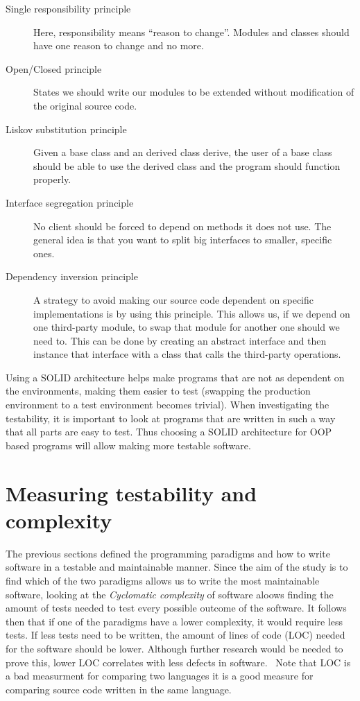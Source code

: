 \begin{description}
    \item [Single responsibility principle] Here, responsibility means ``reason
        to change''. Modules and classes should have one reason to change and no
        more.
    \item [Open/Closed principle] States we should write our modules to be
        extended without modification of the original source code.
    \item [Liskov substitution principle] Given a base class and an derived
        class derive, the user of a base class should be able to use the derived
        class and the program should function properly.
    \item [Interface segregation principle] No client should be forced to depend
        on methods it does not use. The general idea is that you want to split
        big interfaces to smaller, specific ones.
    \item [Dependency inversion principle] A strategy to avoid making our source
        code dependent on specific implementations is by using this principle.
        This allows us, if we depend on one third-party module, to swap that
        module for another one should we need to. This can be done by creating
        an abstract interface and then instance that interface with a class that
        calls the third-party operations.~\cite{martinrobert}
\end{description}

Using a SOLID architecture helps make programs that are not as dependent on the
environments, making them easier to test (swapping the production environment to
a test environment becomes trivial). When investigating the testability, it is
important to look at programs that are written in such a way that all parts
are easy to test. Thus choosing a SOLID architecture for OOP based programs will
allow making more testable software.

\section{Measuring testability and complexity}\label{measuretestability}

The previous sections defined the programming paradigms and how to write
software in a testable and maintainable manner. Since the aim of the study is to
find which of the two paradigms allows us to write the most maintainable
software, looking at the \textit{Cyclomatic complexity} of software aloows
finding the amount of tests needed to test every possible outcome of the
software. It follows then that if one of the paradigms have a lower complexity,
it would require less tests. If less tests need to be written, the amount of
lines of code (LOC) needed for the software should be lower. Although further
research would be needed to prove this, lower LOC correlates with less defects
in software.~\cite{defectloc} Note that LOC is a bad measurment for comparing
two languages it is a good measure for comparing source code written in the same
language.


